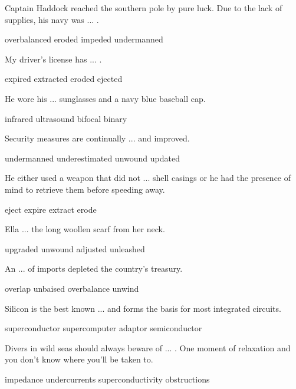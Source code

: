 \documentclass{exam}
\begin{document}
\begin{questions}
\question Captain Haddock reached the southern pole by pure luck. Due to the lack of supplies, his navy was ... .\\
\begin{oneparchoices}
\choice overbalanced 
 \choice eroded
 \choice impeded 
 \correctchoice undermanned
\end{oneparchoices}
\question My driver's license has ... .\\
\begin{oneparchoices} 
\correctchoice expired
 \choice extracted 
 \choice eroded
 \choice ejected
\end{oneparchoices}
\question He wore his ... sunglasses and a navy blue baseball cap.\\
\begin{oneparchoices} 
\choice infrared
 \choice ultrasound
\correctchoice bifocal
 \choice binary 
\end{oneparchoices}
\question Security measures are continually ... and improved.\\
\begin{oneparchoices}
\choice undermanned
\choice underestimated
\choice unwound
\correctchoice updated
\end{oneparchoices}
\question He either used a weapon that did not ... shell casings or he had the presence of mind to retrieve them before speeding away.\\
\begin{oneparchoices}
\correctchoice eject
\choice expire
\choice extract
\choice erode
\end{oneparchoices}
\question Ella ... the long woollen scarf from her neck.\\
\begin{oneparchoices}
\choice upgraded
\correctchoice unwound
\choice adjusted
\choice unleashed
\end{oneparchoices}
\question An ... of imports depleted the country's treasury.\\
\begin{oneparchoices}
\choice overlap
\choice unbaised
\correctchoice overbalance
\choice unwind
\end{oneparchoices}
\question Silicon is the best known ... and forms the basis for most integrated circuits.\\
\begin{oneparchoices} 
\choice superconductor
\choice supercomputer
\choice adaptor
\correctchoice semiconductor
\end{oneparchoices}
\question Divers in wild seas should always beware of ... . One moment of relaxation and you don't know where you'll be taken to.\\
\begin{oneparchoices}
\choice impedance
\correctchoice undercurrents
\choice superconductivity
\choice obstructions 
\end{oneparchoices}


\end{questions}
\end{document}
